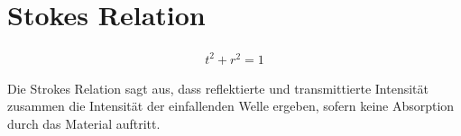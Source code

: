 
\section{Stokes Relation}
\label{sec:stokesRelation}

\begin{align}
    t^2 + r^2 = 1 
\end{align}

Die Strokes Relation sagt aus, dass reflektierte und transmittierte Intensität zusammen die Intensität der einfallenden Welle ergeben, sofern keine Absorption durch das Material auftritt.